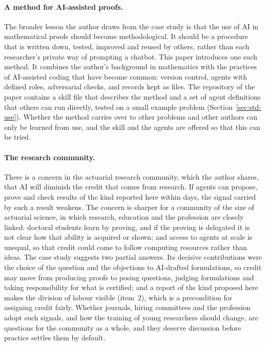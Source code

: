 \paragraph{A method for AI-assisted proofs.}
The broader lesson the author draws from the case study is that the use of AI in mathematical proofs should become
methodological. It should be a procedure that is written down, tested, improved and reused by others, rather than
each researcher's private way of prompting a chatbot. This paper introduces one such method. It combines the
author's background in mathematics with the practices of AI-assisted coding that have become common: version
control, agents with defined roles, adversarial checks, and records kept as files. The repository of the paper
contains a skill file that describes the method and a set of agent definitions that others can run directly, tested
on a small example problem (Section~\ref{sec:std-use}). Whether the method carries over to other problems and other
authors can only be learned from use, and the skill and the agents are offered so that this can be tried.

\paragraph{The research community.}
There is a concern in the actuarial research community, which the author shares, that AI will diminish the credit
that comes from research. If agents can propose, prove and check results of the kind reported here within days, the
signal carried by such a result weakens. The concern is sharper for a community of the size of actuarial science, in
which research, education and the profession are closely linked: doctoral students learn by proving, and if the
proving is delegated it is not clear how that ability is acquired or shown; and access to agents at scale is unequal,
so that credit could come to follow computing resources rather than ideas. The case study suggests two partial
answers. Its decisive contributions were the choice of the question and the objections to AI-drafted formulations, so
credit may move from producing proofs to posing questions, judging formulations and taking responsibility for what is
certified; and a report of the kind proposed here makes the division of labour visible (item~2), which is a
precondition for assigning credit fairly. Whether journals, hiring committees and the profession adopt such signals,
and how the training of young researchers should change, are questions for the community as a whole, and they
deserve discussion before practice settles them by default.

